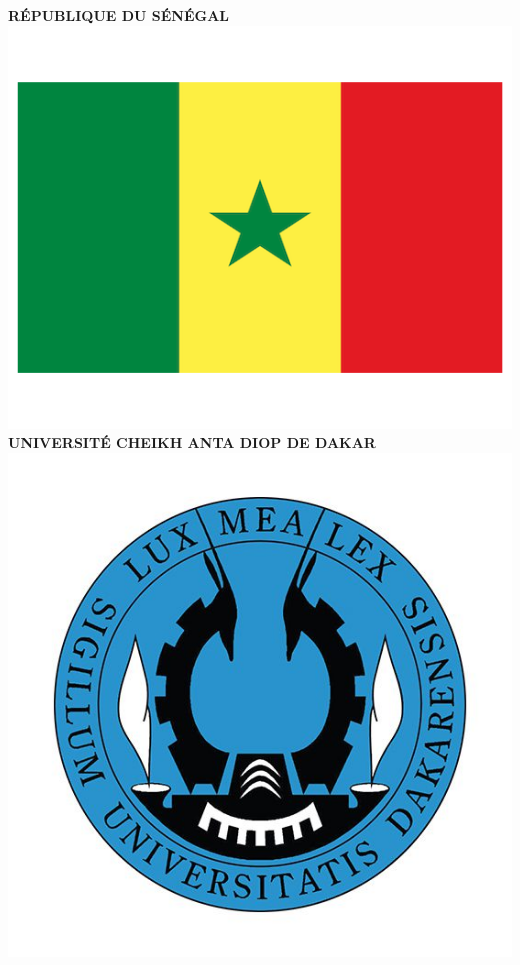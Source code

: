 \documentclass[a4paper, 12pt]{report}
\begin{document}
	\begin{titlepage}
		
		\centering %
		
		
		\textsc{\normalsize \textbf{RÉPUBLIQUE DU SÉNÉGAL}}\\[0.15cm] %
		\includegraphics[scale=.1]{img/flag}\\[0.15cm]
		\textsc{\small \textbf{UNIVERSITÉ CHEIKH ANTA DIOP DE DAKAR}}\\[0.15cm]
		\includegraphics[scale=.2]{img/ucad}\\[0.15cm] %

\end{titlepage}
\end{document}
